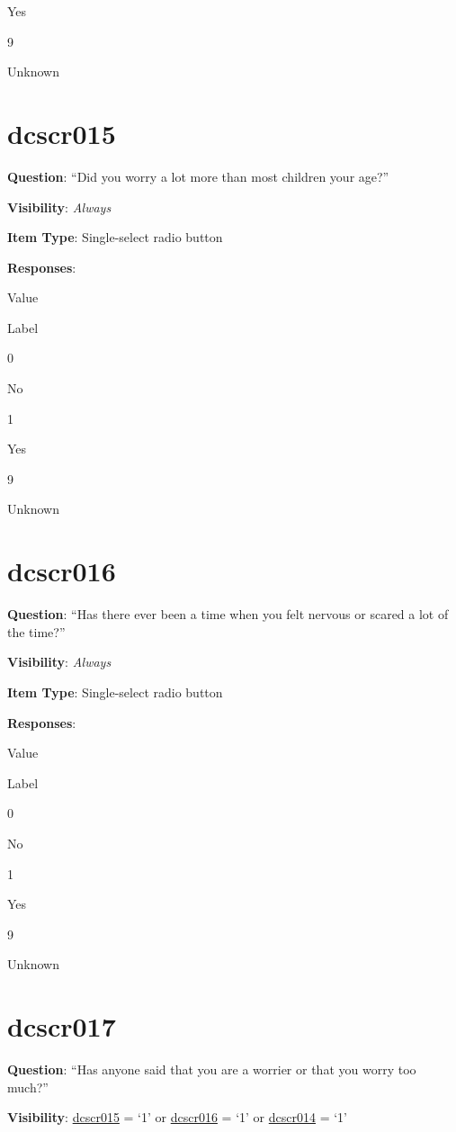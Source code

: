 \documentclass[]{book}
\begin{document}
Yes

9

Unknown

\hypertarget{dcscr015}{%
\section{dcscr015}\label{dcscr015}}

\textbf{Question}: ``Did you worry a lot more than most children your age?''

\textbf{Visibility}: \emph{Always}

\textbf{Item Type}: Single-select radio button

\textbf{Responses}:

Value

Label

0

No

1

Yes

9

Unknown

\hypertarget{dcscr016}{%
\section{dcscr016}\label{dcscr016}}

\textbf{Question}: ``Has there ever been a time when you felt nervous or scared a lot of the time?''

\textbf{Visibility}: \emph{Always}

\textbf{Item Type}: Single-select radio button

\textbf{Responses}:

Value

Label

0

No

1

Yes

9

Unknown

\hypertarget{dcscr017}{%
\section{dcscr017}\label{dcscr017}}

\textbf{Question}: ``Has anyone said that you are a worrier or that you worry too much?''

\textbf{Visibility}: \protect\hyperlink{dcscr015}{dcscr015} = `1' or \protect\hyperlink{dcscr016}{dcscr016} = `1' or \protect\hyperlink{dcscr014}{dcscr014} = `1'
\end{document}
